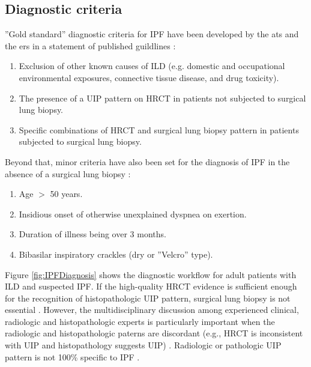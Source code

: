 \subsection{Diagnostic criteria} \label{DiagnosisCriteria}
''Gold standard'' diagnostic criteria for IPF have been developed by the \gls{ats} and the \gls{ers} in a statement of published guildlines \citep{raghu2011official}:
\begin{enumerate}
  \item Exclusion of other known causes of ILD (e.g. domestic and occupational environmental exposures, connective tissue disease, and drug toxicity).
  \item The presence of a UIP pattern on HRCT in patients not subjected to surgical lung biopsy.
  \item Specific combinations of HRCT and surgical lung biopsy pattern in patients subjected to surgical lung biopsy.
\end{enumerate}

Beyond that, minor criteria have also been set for the diagnosis of IPF in the absence of a surgical lung biopsy \citep{raghu2011official}:
\begin{enumerate}
  \item Age $>$ 50 years.
	\item Insidious onset of otherwise unexplained dyspnea on exertion.
	\item Duration of illness being over 3 months.
	\item Bibasilar inspiratory crackles (dry or ''Velcro'' type).
\end{enumerate}

Figure \ref{fig:IPFDiagnosis} shows the diagnostic workflow for adult patients with ILD and suspected IPF. If the high-quality HRCT evidence is sufficient enough for the recognition of histopathologic UIP pattern, surgical lung biopsy is not essential \citep{hunninghake2001utility, raghu1999accuracy, flaherty2003radiological, quadrelli2010radiological}. However, the multidisciplinary discussion among experienced clinical, radiologic and histopathologic experts is particularly important when the radiologic and histopathologic paterns are discordant (e.g., HRCT is inconsistent with UIP and histopathology suggests UIP) \citep{raghu2011official}. Radiologic or pathologic UIP pattern is not 100\% specific to IPF \citep{lynch2006usual, trahan2008role, silva2008chronic}.

